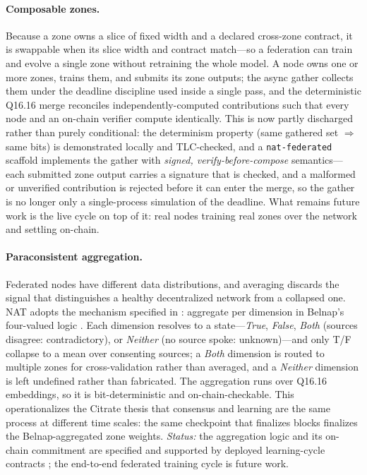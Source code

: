 \documentclass[11pt]{article}
\newcommand{\Qff}{Q16.16}
\begin{document}
\paragraph{Composable zones.}
Because a zone owns a slice of fixed width and a declared cross-zone contract, it is swappable when
its slice width and contract match---so a federation can train and evolve a single zone without
retraining the whole model. A node owns one or more zones, trains them, and submits its zone outputs;
the async gather collects them under the deadline discipline used inside a single pass, and the
deterministic \Qff{} merge reconciles independently-computed contributions such that every node and
an on-chain verifier compute identically. This is now partly discharged rather than purely
conditional: the determinism property (same gathered set $\Rightarrow$ same bits) is demonstrated
locally and TLC-checked, and a \texttt{nat-federated} scaffold implements the gather with
\emph{signed, verify-before-compose} semantics---each submitted zone output carries a signature that
is checked, and a malformed or unverified contribution is rejected before it can enter the merge, so
the gather is no longer only a single-process simulation of the deadline. What remains future work is
the live cycle on top of it: real nodes training real zones over the network and settling on-chain.

\paragraph{Paraconsistent aggregation.}
Federated nodes have different data distributions, and averaging discards the signal that
distinguishes a healthy decentralized network from a collapsed one. NAT adopts the mechanism specified
in \citet{citrate2}: aggregate per dimension in Belnap's four-valued logic \citep{belnap1977useful}.
Each dimension resolves to a state---\emph{True}, \emph{False}, \emph{Both} (sources disagree:
contradictory), or \emph{Neither} (no source spoke: unknown)---and only T/F collapse to a mean over
consenting sources; a \emph{Both} dimension is routed to multiple zones for cross-validation rather
than averaged, and a \emph{Neither} dimension is left undefined rather than fabricated. The
aggregation runs over \Qff{} embeddings, so it is bit-deterministic and on-chain-checkable. This
operationalizes the Citrate thesis that consensus and learning are the same process at different time
scales: the same checkpoint that finalizes blocks finalizes the Belnap-aggregated zone weights.
\emph{Status:} the aggregation logic and its on-chain commitment are specified and supported by
deployed learning-cycle contracts \citep{citrate2}; the end-to-end federated training cycle is future
work.
\end{document}
